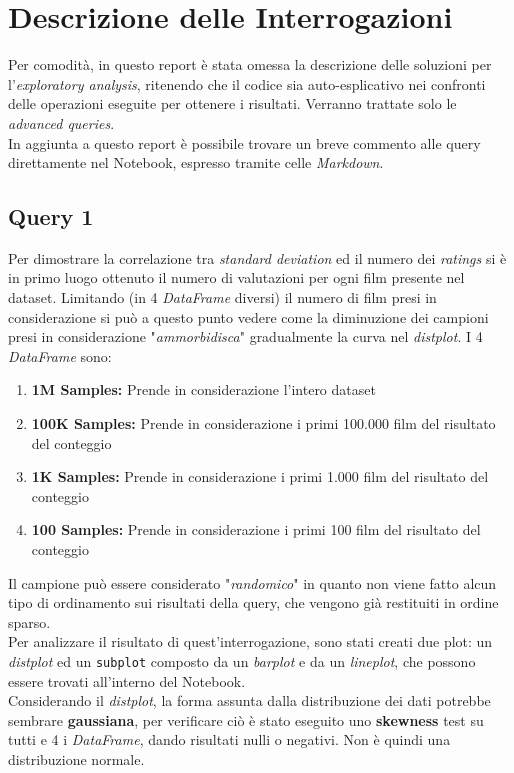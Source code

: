 \documentclass{article}
\begin{document}
    \newpage
    \section{Descrizione delle Interrogazioni}
    Per comodità, in questo report è stata omessa la descrizione delle soluzioni per l'\textit{exploratory analysis}, ritenendo che il codice sia auto-esplicativo nei confronti delle operazioni eseguite per ottenere i risultati. Verranno trattate solo le \textit{advanced queries}.\\
    In aggiunta a questo report è possibile trovare un breve commento alle query direttamente nel Notebook, espresso tramite celle \textit{Markdown}.
    \subsection{Query 1}
        Per dimostrare la correlazione tra \textit{standard deviation} ed il numero dei \textit{ratings} si è in primo luogo ottenuto il numero di valutazioni per ogni film presente nel dataset. Limitando (in 4 \textit{DataFrame} diversi) il numero di film presi in considerazione si può a questo punto vedere come la diminuzione dei campioni presi in considerazione "\textit{ammorbidisca}" gradualmente la curva nel \textit{distplot}. I 4 \textit{DataFrame} sono:
        \begin{enumerate}
            \item \textbf{1M Samples:} Prende in considerazione l'intero dataset
            \item \textbf{100K Samples:} Prende in considerazione i primi 100.000 film del risultato del conteggio
            \item \textbf{1K Samples:} Prende in considerazione i primi 1.000 film del risultato del conteggio
            \item \textbf{100 Samples:} Prende in considerazione i primi 100 film del risultato del conteggio
        \end{enumerate}
        Il campione può essere considerato "\textit{randomico}" in quanto non viene fatto alcun tipo di ordinamento sui risultati della query, che vengono già restituiti in ordine sparso.\\
        Per analizzare il risultato di quest'interrogazione, sono stati creati due plot: un \textit{distplot} ed un \texttt{subplot} composto da un \textit{barplot} e da un \textit{lineplot}, che possono essere trovati all'interno del Notebook.\\
        Considerando il \textit{distplot}, la forma assunta dalla distribuzione dei dati potrebbe sembrare \textbf{gaussiana}, per verificare ciò è stato eseguito uno \textbf{skewness} test su tutti e 4 i \textit{DataFrame}, dando risultati nulli o negativi. Non è quindi una distribuzione normale.\\
\end{document}
